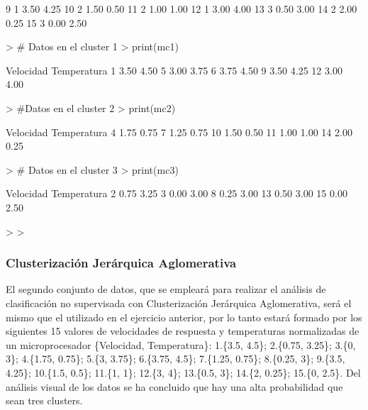 \documentclass[a4paper, 12pt]{article}
\begin{document}
\begin{itemize}
\begin{Schunk}
\begin{Soutput}
9                        1      3.50        4.25
10                       2      1.50        0.50
11                       2      1.00        1.00
12                       1      3.00        4.00
13                       3      0.50        3.00
14                       2      2.00        0.25
15                       3      0.00        2.50
\end{Soutput}
\begin{Sinput}
> # Datos en el cluster 1
> print(mc1)
\end{Sinput}
\begin{Soutput}
   Velocidad Temperatura
1       3.50        4.50
5       3.00        3.75
6       3.75        4.50
9       3.50        4.25
12      3.00        4.00
\end{Soutput}
\begin{Sinput}
> #Datos en el cluster 2
> print(mc2)
\end{Sinput}
\begin{Soutput}
   Velocidad Temperatura
4       1.75        0.75
7       1.25        0.75
10      1.50        0.50
11      1.00        1.00
14      2.00        0.25
\end{Soutput}
\begin{Sinput}
> # Datos en el cluster 3
> print(mc3)
\end{Sinput}
\begin{Soutput}
   Velocidad Temperatura
2       0.75        3.25
3       0.00        3.00
8       0.25        3.00
13      0.50        3.00
15      0.00        2.50
\end{Soutput}
\begin{Sinput}
> 
> 
\end{Sinput}
\end{Schunk}
	\end{itemize}

	\newpage
	\subsubsection{Clusterización Jerárquica Aglomerativa}
	
	El segundo conjunto de datos, que se empleará para realizar el análisis de clasificación no supervisada con Clusterización Jerárquica Aglomerativa, será el mismo que el utilizado en el ejercicio anterior, por lo tanto estará formado por los siguientes 15 valores de velocidades de respuesta y temperaturas normalizadas de un microprocesador \{Velocidad, Temperatura\}: 1.\{3.5, 4.5\}; 2.\{0.75, 3.25\}; 3.\{0, 3\}; 4.\{1.75, 0.75\}; 5.\{3, 3.75\}; 6.\{3.75, 4.5\}; 7.\{1.25, 0.75\}; 8.\{0.25, 3\}; 9.\{3.5, 4.25\}; 10.\{1.5, 0.5\}; 11.\{1, 1\}; 12.\{3, 4\}; 13.\{0.5, 3\}; 14.\{2, 0.25\}; 15.\{0, 2.5\}. Del análisis visual de los datos se ha concluido que hay una alta probabilidad que sean tres clusters.
	
\end{document}
